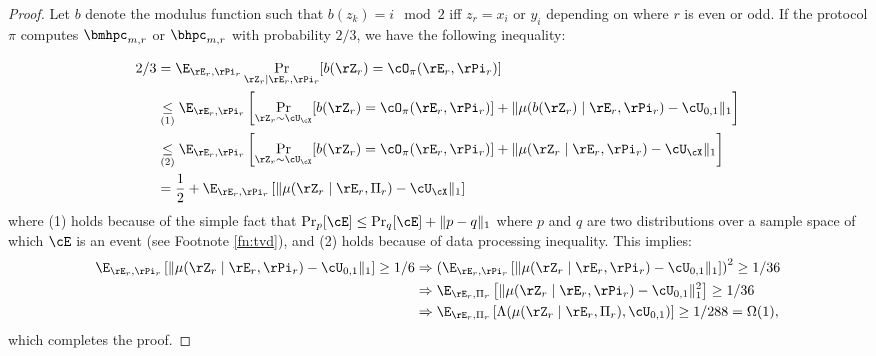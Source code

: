 \begin{proof}
    
 Let $b$ denote the modulus function such that $b(z_k) = i \mod 2$ iff $z_r = x_i$ or $y_i$ depending on where $r$ is even or odd. If the protocol $\pi$ computes $\bmhpc_{m,r}$ or $\bhpc_{m,r}$ with probability $2/3$, we have the following inequality:

 \begin{align*}
     2/3 &= \E_{\rE_r,\rPi_r} \Pr_{\rZ_r \mid \rE_r,\rPi_r} [b(\rZ_r) =
     \cO_\pi(\rE_r,\rPi_r)]\\
     &\underset{(1)}\leq \E_{\rE_r,\rPi_r}\left[\Pr_{\rZ_r \sim
     \cU_{\cX}}[b(\rZ_r) = \cO_\pi(\rE_r,\rPi_r)] + \|\mu(b(\rZ_r) \mid \rE_r,\rPi_r) - \cU_{0,1}\|_1 \right]\\
     &\underset{(2)}\leq \E_{\rE_r,\rPi_r}\left[\Pr_{\rZ_r \sim
     \cU_{\cX}}[b(\rZ_r) = \cO_\pi(\rE_r,\rPi_r)] + \|\mu(\rZ_r \mid \rE_r,\rPi_r) - \cU_\cX\|_1 \right]\\
     &= \frac 1 2 + \E_{\rE_r,\rPi_r}\left[\|\mu(\rZ_r \mid \rE_r,\Pi_r) - \cU_\cX\|_1 \right]
 \end{align*}
 where (1) holds because of the simple fact that $\Pr_p[\cE] \leq \Pr_q[\cE] + \|p-q\|_1$ where $p$ and $q$ are two distributions over a sample space of which $\cE$ is an event (see Footnote \ref{fn:tvd}), and (2) holds because of data processing inequality. This implies:
 \begin{align*}
     \E_{\rE_r,\rPi_r}\left[\|\mu(\rZ_r \mid \rE_r,\rPi_r) - \cU_{0,1}\|_1
     \right] \geq 1/6 &\Rightarrow \left(\E_{\rE_r,\rPi_r}\left[\|\mu(\rZ_r \mid
     \rE_r,\rPi_r) - \cU_{0,1}\|_1 \right] \right)^2\geq 1/36\\
     &\Rightarrow \E_{\rE_r,\Pi_r}\left[\|\mu(\rZ_r \mid \rE_r,\rPi_r) -
     \cU_{0,1}\|_1^2 \right] \geq 1/36\\
     &\Rightarrow \E_{\rE_r,\Pi_r}
     \left[\Lambda(\mu(\rZ_r \mid \rE_r,\Pi_r), \cU_{0,1}) \right]
     \geq 1/288 = \Omega(1),
 \end{align*}
 which completes the proof.
\end{proof}



